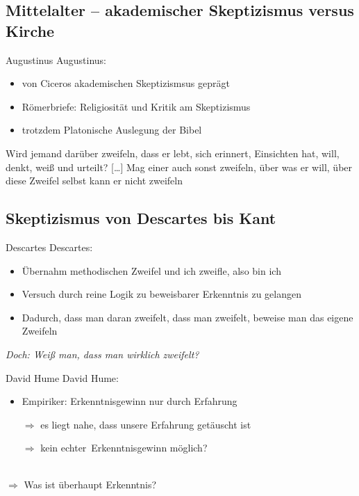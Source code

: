\documentclass[12pt]{beamer}
\begin{document}
\subsection{Mittelalter – akademischer Skeptizismus versus Kirche}
\begin{frame}{Augustinus}
Augustinus:
\begin{itemize}
\item von Ciceros akademischen Skeptizismsus geprägt
\item \glqq Römerbriefe\grqq : Religiosität und Kritik am Skeptizismus
\item trotzdem Platonische Auslegung der Bibel
\end{itemize}
\glqq Wird jemand darüber zweifeln, dass er lebt, sich erinnert, Einsichten hat, will, denkt, weiß und urteilt? [\ldots] Mag einer auch sonst zweifeln, über was er will, über diese Zweifel selbst kann er nicht zweifeln\grqq\ \cite{de_trini_x}
\end{frame}
\subsection{Skeptizismus von Descartes bis Kant}
\begin{frame}{Descartes}
Descartes:
\begin{itemize}
\item Übernahm  methodischen Zweifel und  \glqq ich zweifle, also bin ich\grqq
\item Versuch durch reine Logik zu beweisbarer Erkenntnis zu gelangen
\item Dadurch, dass man daran zweifelt, dass man zweifelt, beweise man das eigene Zweifeln
\end{itemize}
\emph{Doch: Weiß man, dass man wirklich zweifelt?}
\end{frame}

\begin{frame}{David Hume}
David Hume:
\begin{itemize}
\item Empiriker: Erkenntnisgewinn nur durch Erfahrung
\item[$\Rightarrow$] es liegt nahe, dass unsere Erfahrung getäuscht ist
\item[$\Rightarrow$] kein \glqq echter\grqq\ Erkenntnisgewinn möglich?
\end{itemize}
\ \\
$\Rightarrow$ Was ist überhaupt \glqq Erkenntnis\grqq ?
\end{frame}
\end{document}
